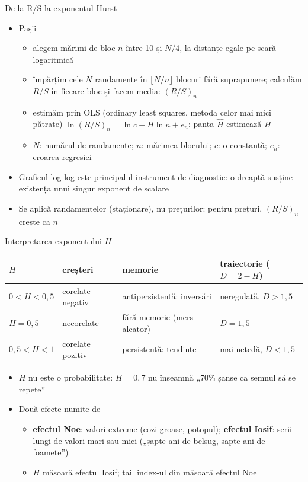 \begin{frame}{De la R/S la exponentul Hurst}
\itemsize{\small}
\begin{itemize}
    \item Pașii 
    \begin{itemize}
        \item alegem mărimi de bloc $n$ între 10 și $N/4$, la distanțe egale pe scară logaritmică
        \item împărțim cele $N$ randamente în $\lfloor N/n\rfloor$ blocuri fără suprapunere; calculăm $R/S$ în fiecare bloc și facem media: $(R/S)_n$
        \item estimăm prin OLS (ordinary least squares, metoda celor mai mici pătrate) $\ln (R/S)_n = \ln c + H \ln n + e_n$: panta $\hat H$ estimează $H$
        \item $N$: numărul de randamente; $n$: mărimea blocului; $c$: o constantă; $e_n$: eroarea regresiei
    \end{itemize}
    \item Graficul log-log este principalul instrument de diagnostic: o dreaptă susține existența unui singur exponent de scalare
    \item Se aplică randamentelor (staționare), nu prețurilor: pentru prețuri, $(R/S)_n$ crește ca $n$
\end{itemize}
\end{frame}

\begin{frame}{Interpretarea exponentului $H$}
\itemsize{\small}
\begin{center}
\footnotesize
\begin{tabular}{llll}
\toprule
$H$ & creșteri & memorie & traiectorie ($D = 2 - H$) \\
\midrule
$0 < H < 0{,}5$ & corelate negativ & antipersistentă: inversări & neregulată, $D > 1{,}5$ \\
$H = 0{,}5$ & necorelate & fără memorie (mers aleator) & $D = 1{,}5$ \\
$0{,}5 < H < 1$ & corelate pozitiv & persistentă: tendințe & mai netedă, $D < 1{,}5$ \\
\bottomrule
\end{tabular}
\end{center}
\begin{itemize}
    \item $H$ nu este o probabilitate: $H = 0{,}7$ nu înseamnă „70\% șanse ca semnul să se repete”
    \item Două efecte numite de 
    \begin{itemize}
        \item \textbf{efectul Noe}: valori extreme (cozi groase, potopul); \textbf{efectul Iosif}: serii lungi de valori mari sau mici („șapte ani de belșug, șapte ani de foamete”)
        \item $H$ măsoară efectul Iosif; tail index-ul din  măsoară efectul Noe
    \end{itemize}
\end{itemize}
\end{frame}

